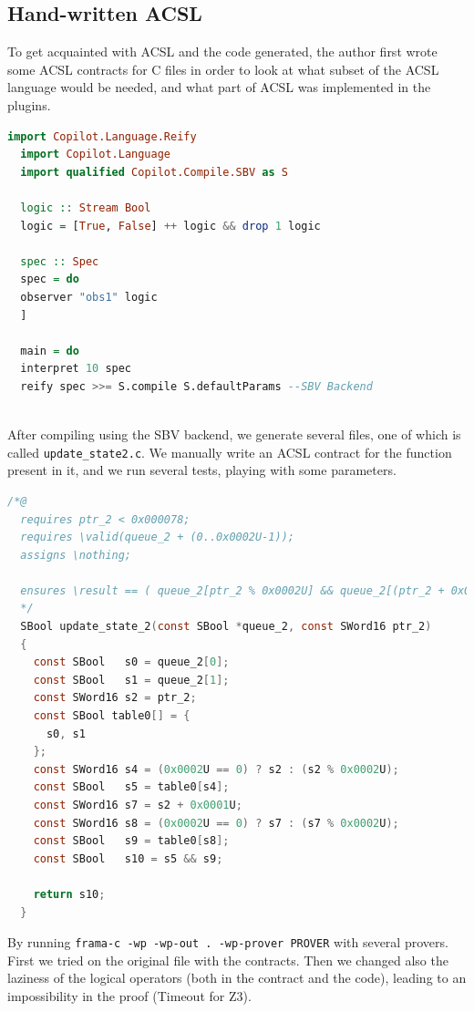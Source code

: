\documentclass[a4paper,11pt,final]{article}
\begin{document}
  \subsection{Hand-written ACSL}
  
  To get acquainted with ACSL and the code generated, the author first wrote some ACSL contracts for C files in order to look at what subset of the ACSL language would be needed, and what part of ACSL was implemented in the plugins.
  
  \begin{lstlisting}[language=Haskell]
  import Copilot.Language.Reify
  import Copilot.Language
  import qualified Copilot.Compile.SBV as S
  
  logic :: Stream Bool
  logic = [True, False] ++ logic && drop 1 logic
  
  spec :: Spec
  spec = do
  observer "obs1" logic
  ]
  
  main = do
  interpret 10 spec
  reify spec >>= S.compile S.defaultParams --SBV Backend
  
  \end{lstlisting}
  
  After compiling using the SBV backend, we generate several files, one of which is called \texttt{update\_state2.c}. We manually write an ACSL contract for the function present in it, and we run several tests, playing with some parameters.
  
  \begin{lstlisting}[language=C, keywordstyle=\color{blue}]
  /*@
  requires ptr_2 < 0x000078;
  requires \valid(queue_2 + (0..0x0002U-1));
  assigns \nothing;
  
  ensures \result == ( queue_2[ptr_2 % 0x0002U] && queue_2[(ptr_2 + 0x0001U) % 0x0002U]);
  */
  SBool update_state_2(const SBool *queue_2, const SWord16 ptr_2)
  {
    const SBool   s0 = queue_2[0];
    const SBool   s1 = queue_2[1];
    const SWord16 s2 = ptr_2;
    const SBool table0[] = {
      s0, s1
    };
    const SWord16 s4 = (0x0002U == 0) ? s2 : (s2 % 0x0002U);
    const SBool   s5 = table0[s4];
    const SWord16 s7 = s2 + 0x0001U;
    const SWord16 s8 = (0x0002U == 0) ? s7 : (s7 % 0x0002U);
    const SBool   s9 = table0[s8];
    const SBool   s10 = s5 && s9;
  
    return s10;
  }
  \end{lstlisting}
  By running \texttt{frama-c -wp -wp-out . -wp-prover PROVER} with several provers. First we tried on the original file with the contracts. Then we changed also the laziness of the logical operators (both in the contract and the code), leading to an impossibility in the proof (Timeout for Z3). 
  
\end{document}
